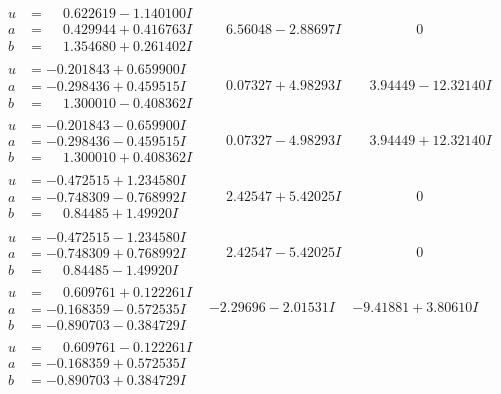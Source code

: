\documentclass[1p]{elsarticle_modified}
\theoremstyle{definition}
\begin{document}
$$\begin{array}{c|c|c}
\begin{aligned}
u &= \phantom{-}0.622619 - 1.140100 I \\
a &= \phantom{-}0.429944 + 0.416763 I \\
b &= \phantom{-}1.354680 + 0.261402 I\end{aligned}
 & \phantom{-}6.56048 - 2.88697 I & \phantom{-0.000000 } 0 \\ \hline\begin{aligned}
u &= -0.201843 + 0.659900 I \\
a &= -0.298436 + 0.459515 I \\
b &= \phantom{-}1.300010 - 0.408362 I\end{aligned}
 & \phantom{-}0.07327 + 4.98293 I & \phantom{-}3.94449 - 12.32140 I \\ \hline\begin{aligned}
u &= -0.201843 - 0.659900 I \\
a &= -0.298436 - 0.459515 I \\
b &= \phantom{-}1.300010 + 0.408362 I\end{aligned}
 & \phantom{-}0.07327 - 4.98293 I & \phantom{-}3.94449 + 12.32140 I \\ \hline\begin{aligned}
u &= -0.472515 + 1.234580 I \\
a &= -0.748309 - 0.768992 I \\
b &= \phantom{-}0.84485 + 1.49920 I\end{aligned}
 & \phantom{-}2.42547 + 5.42025 I & \phantom{-0.000000 } 0 \\ \hline\begin{aligned}
u &= -0.472515 - 1.234580 I \\
a &= -0.748309 + 0.768992 I \\
b &= \phantom{-}0.84485 - 1.49920 I\end{aligned}
 & \phantom{-}2.42547 - 5.42025 I & \phantom{-0.000000 } 0 \\ \hline\begin{aligned}
u &= \phantom{-}0.609761 + 0.122261 I \\
a &= -0.168359 - 0.572535 I \\
b &= -0.890703 - 0.384729 I\end{aligned}
 & -2.29696 - 2.01531 I & -9.41881 + 3.80610 I \\ \hline\begin{aligned}
u &= \phantom{-}0.609761 - 0.122261 I \\
a &= -0.168359 + 0.572535 I \\
b &= -0.890703 + 0.384729 I\end{aligned}

\end{array}$$
\end{document}
